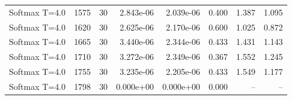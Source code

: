 \begin{scriptsize}
\begin{longtable}{llrrrrrr}
Softmax T=4.0 & 1575 & 30 & 2.843e-06 & 2.039e-06 & 0.400 & 1.387 & 1.095 \\
Softmax T=4.0 & 1620 & 30 & 2.625e-06 & 2.170e-06 & 0.600 & 1.025 & 0.872 \\
Softmax T=4.0 & 1665 & 30 & 3.440e-06 & 2.344e-06 & 0.433 & 1.431 & 1.143 \\
Softmax T=4.0 & 1710 & 30 & 3.272e-06 & 2.349e-06 & 0.367 & 1.552 & 1.245 \\
Softmax T=4.0 & 1755 & 30 & 3.235e-06 & 2.205e-06 & 0.433 & 1.549 & 1.177 \\
Softmax T=4.0 & 1798 & 30 & 0.000e+00 & 0.000e+00 & 0.000 & -- & -- \\
\bottomrule
\end{longtable}
\end{scriptsize}
